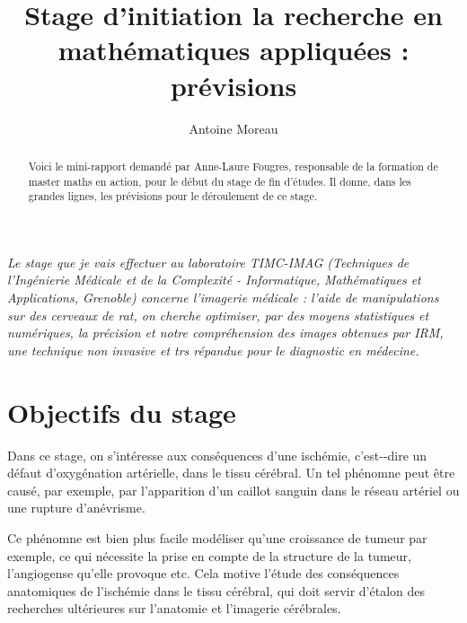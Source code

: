 \documentclass[a4paper,10pt]{article}
\title{Stage d'initiation \g{a} la recherche en math\'ematiques appliqu\'ees : pr\'evisions}
\author{Antoine Moreau}
\begin{document}

\maketitle

\begin{abstract}
Voici le mini-rapport demand\'e par Anne-Laure Fougres, responsable de la formation de master \og{} maths en action\fg{}, %
pour le d\'ebut du stage de fin d'\'etudes. Il donne, dans les grandes lignes, les pr\'evisions pour le d\'eroulement de ce stage.
\end{abstract}

\emph{%
Le stage que je vais effectuer au laboratoire TIMC-IMAG (Techniques de l'Ing\'enierie M\'edicale et de la Complexit\'e - Informatique, Math\'ematiques et Applications, Grenoble) %
concerne l'imagerie m\'edicale :  l'aide de manipulations sur des cerveaux de rat, on cherche  optimiser, %
par des moyens statistiques et num\'eriques, la pr\'ecision et notre compr\'ehension des images obtenues par IRM, une technique non invasive et trs r\'epandue pour le diagnostic en m\'edecine.%
}

\section{Objectifs du stage}

Dans ce stage, on s'int\'eresse aux cons\'equences d'une isch\'emie, c'est--dire un d\'efaut d'oxyg\'enation art\'erielle, %
dans le tissu c\'er\'ebral. Un tel ph\'enomne peut \^etre caus\'e, par exemple, par l'apparition d'un caillot sanguin dans le r\'eseau art\'eriel ou une rupture d'an\'evrisme.

\par
Ce ph\'enomne est bien plus facile  mod\'eliser qu'une croissance de tumeur par exemple, ce qui n\'ecessite la prise en compte de la structure de la tumeur, l'angiogense qu'elle provoque etc. %
Cela motive l'\'etude des cons\'equences anatomiques de l'isch\'emie dans le tissu c\'er\'ebral, qui doit servir d'\'etalon  des recherches ult\'erieures sur l'anatomie et l'imagerie c\'er\'ebrales.
\end{document}
